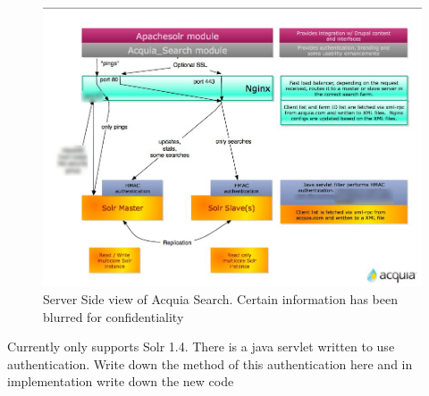 \begin{figure}[H]
     \includegraphics[width=\textwidth]{images/acquia_architecture.jpg}
     \caption{Server Side view of Acquia Search. Certain information has been blurred for confidentiality}
\end{figure}



Currently only supports Solr 1.4. There is a java servlet written to use authentication. Write down the method of this authentication here and in implementation write down the new code
